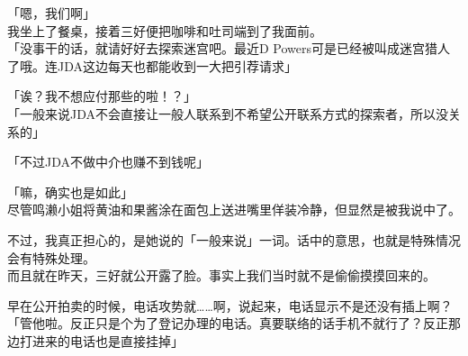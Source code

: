 「嗯，我们啊」\\

我坐上了餐桌，接着三好便把咖啡和吐司端到了我面前。\\

「没事干的话，就请好好去探索迷宫吧。最近D Powers可是已经被叫成迷宫猎人了哦。连JDA这边每天也都能收到一大把引荐请求」

「诶？我不想应付那些的啦！？」\\

「一般来说JDA不会直接让一般人联系到不希望公开联系方式的探索者，所以没关系的」

「不过JDA不做中介也赚不到钱呢」

「嘛，确实也是如此」\\

尽管鸣濑小姐将黄油和果酱涂在面包上送进嘴里佯装冷静，但显然是被我说中了。

不过，我真正担心的，是她说的「一般来说」一词。话中的意思，也就是特殊情况会有特殊处理。\\

而且就在昨天，三好就公开露了脸。事实上我们当时就不是偷偷摸摸回来的。

早在公开拍卖的时候，电话攻势就……啊，说起来，电话显示不是还没有插上啊？\\

「管他啦。反正只是个为了登记办理的电话。真要联络的话手机不就行了？反正那边打进来的电话也是直接挂掉」

